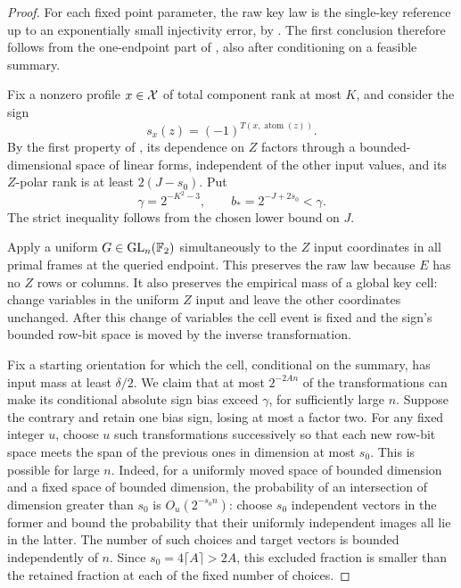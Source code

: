 \begin{proof}
For each fixed point parameter, the raw key law is the single-key
reference up to an exponentially small injectivity error, by
. The first conclusion therefore follows from
the one-endpoint part of , also after conditioning
on a feasible summary.

Fix a nonzero profile $x\in\mathcal X$ of total component rank at most $K$,
and consider the sign
\[
 s_x(z)=(-1)^{T(x,\operatorname{atom}(z))}.
\]
By the first property of , its dependence on
$Z$ factors through a bounded-dimensional space of linear forms,
independent of the other input values, and its $Z$-polar rank is at
least $2(J-s_0)$. Put
\[
 \gamma=2^{-K^2-3},\qquad b_*=2^{-J+2s_0}<\gamma.
\]
The strict inequality follows from the chosen lower bound on $J$.

Apply a uniform $G\in\operatorname{GL}_n(\mathbb F_2)$ simultaneously to the $Z$ input
coordinates in all primal frames at the queried endpoint. This
preserves the raw law because $E$ has no $Z$ rows or columns. It also
preserves the empirical mass of a global key cell: change variables
in the uniform $Z$ input and leave the other coordinates unchanged.
After this change of variables the cell event is fixed and the sign's
bounded row-bit space is moved by the inverse transformation.

Fix a starting orientation for which the cell, conditional on the
summary, has input mass at least $\delta/2$. We claim that at most
$2^{-2An}$ of the transformations can make its conditional absolute
sign bias exceed $\gamma$, for sufficiently large $n$. Suppose the
contrary and retain one bias sign, losing at most a factor two. For
any fixed integer $u$, choose $u$ such transformations successively so
that each new row-bit space meets the span of the previous ones in
dimension at most $s_0$. This is possible for large $n$. Indeed, for
a uniformly moved space of bounded dimension and a fixed space of
bounded dimension, the probability of an intersection of dimension
greater than $s_0$ is $O_u(2^{-s_0n})$: choose $s_0$ independent
vectors in the former and bound the probability that their uniformly
independent images all lie in the latter. The number of such choices
and target vectors is bounded independently of $n$. Since
$s_0=4\lceil A\rceil>2A$, this excluded fraction is smaller than the
retained fraction at each of the fixed number of choices.


\end{proof}
